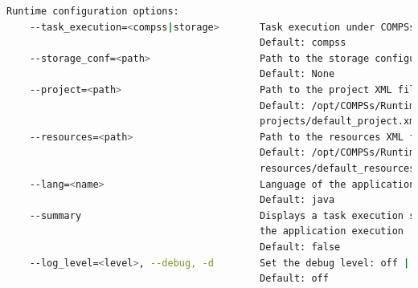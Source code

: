 \begin{lstlisting}[language=bash]
  Runtime configuration options:
    --task_execution=<compss|storage>       Task execution under COMPSs or Storage.
                                            Default: compss
    --storage_conf=<path>                   Path to the storage configuration file
                                            Default: None
    --project=<path>                        Path to the project XML file
                                            Default: /opt/COMPSs/Runtime/configuration/xml/
                                            projects/default_project.xml
    --resources=<path>                      Path to the resources XML file
                                            Default: /opt/COMPSs/Runtime/configuration/xml/
                                            resources/default_resources.xml                                                 
    --lang=<name>                           Language of the application (java/c/python)
                                            Default: java
    --summary                               Displays a task execution summary at the end of 
                                            the application execution
                                            Default: false
    --log_level=<level>, --debug, -d        Set the debug level: off | info | debug
                                            Default: off
                                                                                                                                                                                        

\end{lstlisting}
